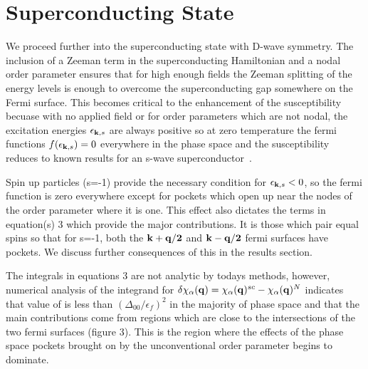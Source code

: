 \documentclass[usletter,aps,prb,10pt,amssymb,amsmath,twocolumn]{revtex4-1}
\begin{document}
\section{Superconducting State}
We proceed further into the superconducting state with D-wave symmetry. The inclusion of a Zeeman term in the superconducting Hamiltonian and a nodal order parameter ensures that for high enough fields the Zeeman splitting of the energy levels is enough to overcome the superconducting gap somewhere on the Fermi surface. This becomes critical to the enhancement of the susceptibility becuase with no applied field or for order parameters which are not nodal, the excitation energies $\epsilon_{{\bf k},s}$ are always positive so at zero temperature the fermi functions $f(\epsilon_{{\bf k},s})=0$ everywhere in the phase space and the susceptibility reduces to known results for an s-wave superconductor~\cite{spin_sus}.

Spin up particles (s=-1) provide the necessary condition for $\epsilon_{{\bf k},s}<0$, so the fermi function is zero everywhere except for pockets which open up near the nodes of the order parameter where it is one. This effect also dictates the terms in equation(s) 3 which provide the major contributions. It is those which pair equal spins so that for s=-1, both the $\bf {k+q}/2$ and $\bf{k-q}/2$ fermi surfaces have pockets. We discuss further consequences of this in the results section.
 
The integrals in equations 3 are not analytic by todays methods, however, numerical analysis of the integrand for $\delta \chi_{\alpha}({\bf q})= \chi_{\alpha}({\bf q})^{sc}- \chi_{\alpha}({\bf q})^N$ indicates that value of is less than $(\Delta_{00}/\epsilon_f)^2$ in the majority of phase space and that the main contributions come from regions which are close to the intersections of the two fermi surfaces (figure 3). This is the region where the effects of the phase space pockets brought on by the unconventional order parameter begins to dominate.~\cite{sc_afm_kato,sdw_vortex,sc_afm_ikeda}  
\end{document}
